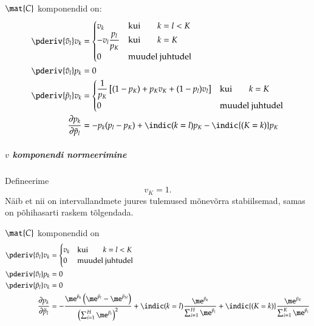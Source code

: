 \documentclass[a4paper]{article}
\numberwithin{equation}{subsection}
\begin{document}
$\mat{C}$ komponendid on:
\begin{align}
 \pderiv{\tilde{v}_l}v_k
  &=
  \begin{cases}
    v_k & \text{kui\qquad} k = l < K\\
    -v_l \displaystyle\frac{p_l}{p_K} & \text{kui\qquad} k = K\\
    0             & \text{muudel juhtudel}
  \end{cases}\\
  \pderiv{\tilde{v}_l}p_k
  &=
  0\\
  \pderiv{\tilde{p}_l}v_k
  &=
  \begin{cases}
    \displaystyle\frac{1}{p_K}
    \left[
      (1 - p_K) + p_K v_K + (1 - p_l)v_l
    \right]
    & \text{kui\qquad} k = K\\
    0 & \text{muudel juhtudel}
  \end{cases}\\
  \frac{\partial p_k}{\partial \tilde p_l} 
  &= 
  -p_k(p_l - p_K) 
  +
  \indic(k=l) p_K
  -
  \indic{(K=k)}
  p_K
\end{align}



\subparagraph{$v$ komponendi normeerimine}
Defineerime
\begin{equation}
  v_K = 1.
\end{equation}
Näib et nii on intervallandmete juures tulemused mõnevõrra
stabiilsemad, samas on põhihasarti raskem tõlgendada.

$\mat{C}$ komponendid on
\begin{align}
 \pderiv{\tilde{v}_l}v_k
  &=
  \begin{cases}
    v_k & \text{kui\qquad} k = l < K\\
    0             & \text{muudel juhtudel}
  \end{cases}\\
  \pderiv{\tilde{v}_l}p_k
  &=
  0\\
  \pderiv{\tilde{p}_l}v_k
  &=
  0\\
  \frac{\partial p_k}{\partial \tilde p_l} 
  &= 
  -\frac{\displaystyle \me^{\tilde p_k} 
    \left(\me^{\tilde p_l} - \me^{\tilde p_H} \right)}
  {\left( \sum_{i=1}^H \me^{\tilde p_i} \right)^2} +
  \indic(k=l) 
  \frac{\me^{\tilde p_k}}{ \sum_{i=1}^H \me^{\tilde p_i}}
  +
  \indic{(K=k)}
  \frac{\me^{\tilde{p}_K}}
  {\sum_{i=1}^K \me^{\tilde{p}_i}}
\end{align}
\end{document}
